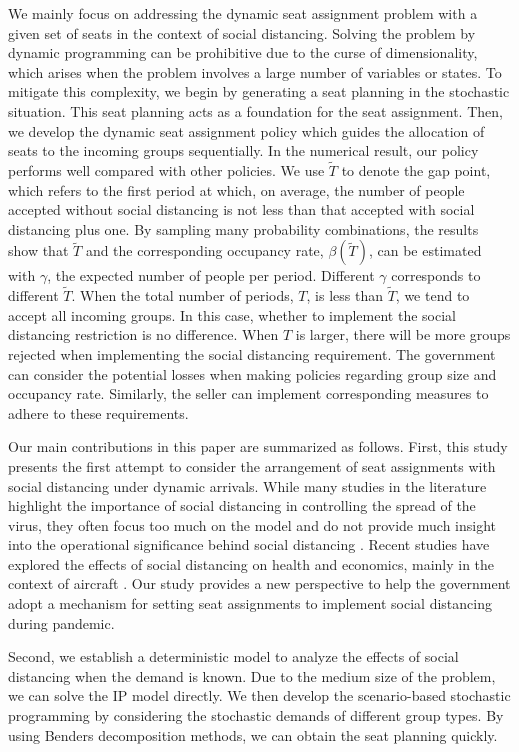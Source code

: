 We mainly focus on addressing the dynamic seat assignment problem with a given set of seats in the context of social distancing. Solving the problem by dynamic programming can be prohibitive due to the curse of dimensionality, which arises when the problem involves a large number of variables or states. To mitigate this complexity, we begin by generating a seat planning in the stochastic situation. This seat planning acts as a foundation for the seat assignment. Then, we develop the dynamic seat assignment policy which guides the allocation of seats to the incoming groups sequentially. In the numerical result, our policy performs well compared with other policies. 
We use $\tilde{T}$ to denote the gap point, which refers to the first period at which, on average, the number of people accepted without social distancing is not less than that accepted with social distancing plus one. By sampling many probability combinations, the results show that $\tilde{T}$ and the corresponding occupancy rate, $\beta(\tilde{T})$, can be estimated with $\gamma$, the expected number of people per period. Different $\gamma$ corresponds to different $\tilde{T}$. When the total number of periods, $T$, is less than $\tilde{T}$, we tend to accept all incoming groups. In this case, whether to implement the social distancing restriction is no difference. When $T$ is larger, there will be more groups rejected when implementing the social distancing requirement. The government can consider the potential losses when making policies regarding group size and occupancy rate. Similarly, the seller can implement corresponding measures to adhere to these requirements.


Our main contributions in this paper are summarized as follows. First, this study presents the first attempt to consider the arrangement of seat assignments with social distancing under dynamic arrivals. While many studies in the literature highlight the importance of social distancing in controlling the spread of the virus, they often focus too much on the model and do not provide much insight into the operational significance behind social distancing \cite{barry2021optimal, fischetti2021safe}. Recent studies have explored the effects of social distancing on health and economics, mainly in the context of aircraft \cite{salari2020social, ghorbani2020model, salari2022social}. Our study provides a new perspective to help the government adopt a mechanism for setting seat assignments to implement social distancing during pandemic.

Second, we establish a deterministic model to analyze the effects of social distancing when the demand is known. Due to the medium size of the problem, we can solve the IP model directly. We then develop the scenario-based stochastic programming by considering the stochastic demands of different group types. By using Benders decomposition methods, we can obtain the seat planning quickly. 

